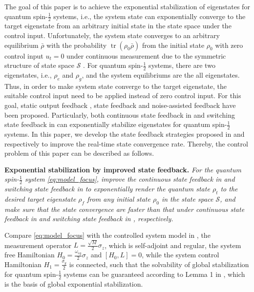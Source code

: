 \documentclass[]{elsarticle}
\begin{document}
The goal of this paper is to achieve the exponential stabilization of eigenstates for quantum spin-$\frac{1}{2}$ systems, i.e., the system state can exponentially converge to the target eigenstate from an arbitrary initial state in the state space under the control input. Unfortunately, the system state converges to an arbitrary equilibrium $\bar{\rho}$ with the probability $\operatorname{tr}\left(\rho_{0}\bar{\rho}\right)$ from the initial state $\rho_{0}$ with zero control input $u_t=0$ under continuous measurement due to the symmetric structure of state space $\mathcal{S}$ \cite{LAMC2018}. For  quantum spin-$\frac{1}{2}$ systems, there are two eigenstates, i.e., $\rho_e$ and $\rho_g$, and the system equilibriums are the all eigenstates.
Thus, in order to make system state converge to the target eigenstate, the suitable control input need to be applied instead of zero control input. For this goal, static output feedback \cite{WWJ2001,TV2008,TV2009}, state feedback \cite{HSMJ2005,MHJ2007,CWKMJ2016,TC2007,TC2008,GVHJ2012,VGLC2015,LAMC2018,LAMOn2020a,LAMOn2020b,WSLJ2018,LAMJ2019,WSPJZJ2020,WSJZJ2021b} and noise-assisted feedback \cite{CardonaPHD2019,CSRJ2020,WSJZJ2021} have been proposed. Particularly, both continuous state feedback in \cite{LAMC2018} and switching state feedback in \cite{WSJZJ2021b} can exponentially stabilize eigenstates for quantum spin-$\frac{1}{2}$ systems. In this paper, we develop the state feedback strategies proposed in \cite{LAMC2018} and \cite{WSJZJ2021b} respectively to improve the real-time state convergence rate. Thereby, the control problem of this paper can be described as follows. 

\textbf{Exponential stabilization by improved state feedback.}
\textit{For the quantum spin-$\frac{1}{2}$ system \eqref{eq:model_focus}, improve the continuous state feedback in \cite{LAMC2018} and switching state feedback in \cite{WSJZJ2021b} to exponentially render the quantum state $\rho_{t}$ to the desired target eigenstate $\rho_f$  from any initial state $\rho_{0}$ in the state space $\mathcal{S}$, and make sure that the state convergence are faster than that under continuous state feedback in \cite{LAMC2018} and switching state feedback in \cite{WSJZJ2021b}, respectively.}

Compare \eqref{eq:model_focus} with the controlled system model in \cite{GVHJ2012}, the measurement operator $L=\frac{\sqrt{M}}{2}\sigma_z$, which is self-adjoint and regular, the system free Hamiltonian $H_0=\frac{\omega_{eg}}{2}\sigma_z$ and $\left[H_0, L\right]=0$, while the system control Hamiltonian $H_1=\frac{\sigma_y}{2}$ is connected, such that the solvability of global stabilization for quantum spin-$\frac{1}{2}$ systems can be guaranteed according to Lemma 1 in \cite{GVHJ2012}, which is the basis of global exponential stabilization.
\end{document}
